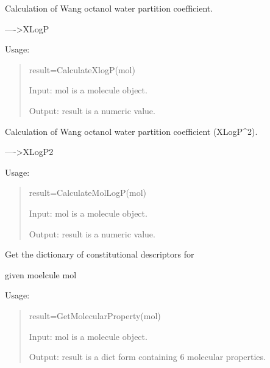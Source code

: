 \documentclass[letterpaper,10pt,english]{sphinxmanual}
\begin{document}

\begin{fulllineitems}
\label{reference/molproperty:molproperty.CalculateXlogP}
Calculation of Wang octanol water partition coefficient.

----\textgreater{}XLogP

Usage:
\begin{quote}

result=CalculateXlogP(mol)

Input: mol is a molecule object.

Output: result is a numeric value.
\end{quote}

\end{fulllineitems}


\begin{fulllineitems}
\label{reference/molproperty:molproperty.CalculateXlogP2}
Calculation of Wang octanol water partition coefficient (XLogP\textasciicircum{}2).

----\textgreater{}XLogP2

Usage:
\begin{quote}

result=CalculateMolLogP(mol)

Input: mol is a molecule object.

Output: result is a numeric value.
\end{quote}

\end{fulllineitems}


\begin{fulllineitems}
\label{reference/molproperty:molproperty.GetMolecularProperty}
Get the dictionary of constitutional descriptors for

given moelcule mol

Usage:
\begin{quote}

result=GetMolecularProperty(mol)

Input: mol is a molecule object.

Output: result is a dict form containing 6 molecular properties.
\end{quote}

\end{fulllineitems}
\end{document}
